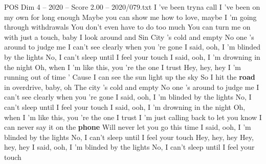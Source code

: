 \begin{textsample}{POS Dim 4 – 2020 – Score 2.00 – 2020/079.txt}  \label{ex:f4_pos_026}
I 've been tryna call I 've been on my own for long enough Maybe you can show me how to love, maybe I 'm going through withdrawals You don't even have to do too much You can turn me on with just a touch, baby I look around and Sin City 's cold and empty No one 's around to judge me I can't see clearly when you 're gone I said, ooh, I 'm blinded by the lights No, I can't sleep until I feel your touch I said, ooh, I 'm drowning in the night Oh, when I 'm like this, you 're the one I trust Hey, hey, hey I 'm running out of time ' Cause I can see the sun light up the sky So I hit the \textbf{road} in overdrive, baby, oh The city 's cold and empty No one 's around to judge me I can't see clearly when you 're gone I said, ooh, I 'm blinded by the lights No, I can't sleep until I feel your touch I said, ooh, I 'm drowning in the night Oh, when I 'm like this, you 're the one I trust I 'm just calling back to let you know I can never say it on the \textbf{phone} Will never let you go this time I said, ooh, I 'm blinded by the lights No, I can't sleep until I feel your touch Hey, hey, hey Hey, hey, hey I said, ooh, I 'm blinded by the lights No, I can't sleep until I feel your touch

\end{textsample}
